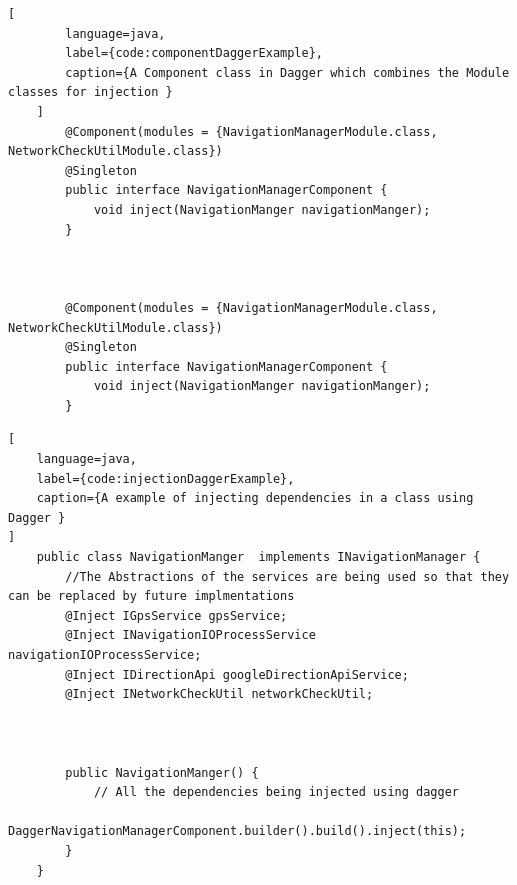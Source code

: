     \newpage
    \begin{lstlisting}[
        language=java,
        label={code:componentDaggerExample},
        caption={A Component class in Dagger which combines the Module classes for injection }
    ]
        @Component(modules = {NavigationManagerModule.class, NetworkCheckUtilModule.class})
        @Singleton
        public interface NavigationManagerComponent {
            void inject(NavigationManger navigationManger);
        }

                
            
        @Component(modules = {NavigationManagerModule.class, NetworkCheckUtilModule.class})
        @Singleton
        public interface NavigationManagerComponent {
            void inject(NavigationManger navigationManger);
        }
\end{lstlisting}

\newpage
\begin{lstlisting}[
    language=java,
    label={code:injectionDaggerExample},
    caption={A example of injecting dependencies in a class using Dagger }
]
    public class NavigationManger  implements INavigationManager {
        //The Abstractions of the services are being used so that they can be replaced by future implmentations
        @Inject IGpsService gpsService;
        @Inject INavigationIOProcessService navigationIOProcessService;
        @Inject IDirectionApi googleDirectionApiService;
        @Inject INetworkCheckUtil networkCheckUtil;



        public NavigationManger() {
            // All the dependencies being injected using dagger
            DaggerNavigationManagerComponent.builder().build().inject(this);
        }
    } 
\end{lstlisting}